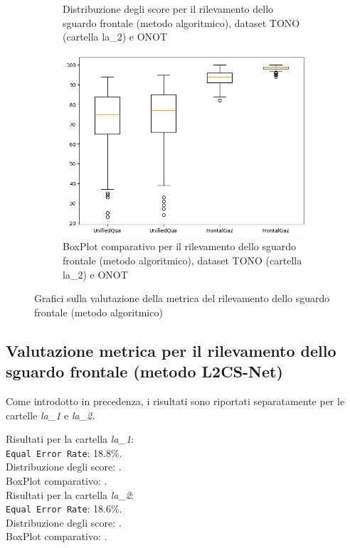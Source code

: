 \documentclass[12pt,a4paper,openright,twoside]{book}
\begin{document}
\begin{figure}[htbp]
\begin{subfigure}{0.49\textwidth}
        \caption{Distribuzione degli score per il rilevamento dello sguardo frontale (metodo algoritmico), dataset TONO (cartella la\_2) e ONOT}
        \label{fig:score_distribution_tono_onot_l2_frontal_gaze_algo}
    \end{subfigure}
    \hfill
    \begin{subfigure}{0.49\textwidth}
        \centering
        \includegraphics[width=.7\linewidth]{figures/box-plot-tono-onot-l2-frontal-gaze-algo.png}
        \caption{BoxPlot comparativo per il rilevamento dello sguardo frontale (metodo algoritmico), dataset TONO (cartella la\_2) e ONOT}
        \label{fig:box_plot_tono_onot_l2_frontal_gaze_algo}
    \end{subfigure}

    \caption{Grafici sulla valutazione della metrica del rilevamento dello sguardo frontale (metodo algoritmico)}
\end{figure}

\subsection{Valutazione metrica per il rilevamento dello sguardo frontale (metodo L2CS-Net)}
\label{chap:evaluatoin_l2csnet}
Come introdotto in precedenza, i risultati sono riportati separatamente per le cartelle \textit{la\_1} e \textit{la\_2}.

\noindent Risultati per la cartella \textit{la\_1}: \\
\texttt{Equal Error Rate}: 18.8\%. \\
Distribuzione degli score: . \\
BoxPlot comparativo: . \\

\noindent Risultati per la cartella \textit{la\_2}: \\
\texttt{Equal Error Rate}: 18.6\%. \\
Distribuzione degli score: . \\
BoxPlot comparativo: . 
\end{document}
